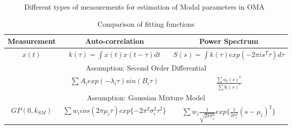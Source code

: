 \begin{figure}[!ht]
  \centering
  \quad
  \quad
  
  \caption{Different types of measurements for estimation of Modal parameters in OMA}
\end{figure}

\renewcommand{\arraystretch}{1.2}
\begin{table}[!ht]
    \centering
\begin{tabularx}{\textwidth}{c|c|c}
  \hline
  Measurement & Auto-correlation & Power Spectrum \\
  \hline
  $x(t)$ & $k(\tau) = \int x(t)x(t-\tau)dt$ &  $S(s) = \int k(\tau)exp(-2 \pi i s^{T} \tau )d\tau$\\
  \hline \hline
  \multicolumn{3}{|c|}{Assumption: Second Order Differential}\\
  \hline
   & $ \sum A_{i}exp(-\lambda_{i}\tau)sin(B_{i}\tau)$ & $\frac{\sum a_{k}(s)^{k}}{\sum b_{l}(s)^{l}}$\\
   \hline \hline
   \multicolumn{3}{|c|}{Assumption: Gaussian Mixture Model}\\
   \hline
   $GP(0 , k_{SM})$ 
   & $  \sum w_{i} cos(2\pi\mu_{i}\tau) exp\{-2\pi^{2}\sigma_{i}^{2}\tau^{2}\}$ 
   & $ \sum w_{i}  \frac{1}{\sqrt{2\pi\sigma_{i}^{2}}}exp\{\frac{1}{2\sigma_{i}^{2}}(s-\mu_{i})^{2}\} $\\
   \hline
\end{tabularx}
\caption{Comparison of fitting functions}
  \label{tab:comparisonOfFittingFunctions}
\end{table}

